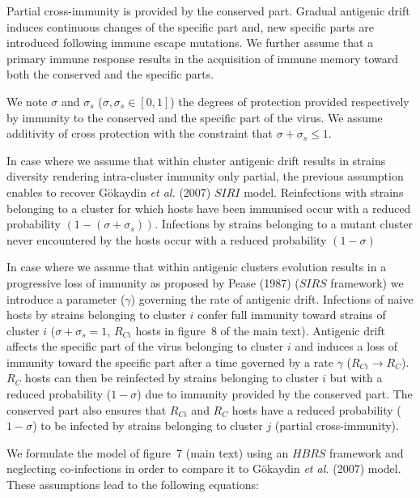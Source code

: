 Partial cross-immunity is provided by the conserved part. Gradual
antigenic drift induces continuous changes of the specific part and,
new specific parts are introduced following immune escape mutations.
We further assume that a primary immune response results in the
acquisition of immune memory toward both the conserved and the
specific parts.

We note $\sigma$ and $\sigma_s$ ($\sigma, \sigma_s \in [0,1]$) the
degrees of protection provided respectively by immunity to the
conserved and the specific part of the virus. We assume additivity of
cross protection with the constraint that $\sigma + \sigma_s \leq 1$.

In case where we assume that within cluster antigenic drift results in
strains diversity rendering intra-cluster immunity only partial, the
previous assumption enables to recover Gökaydin \textit{et al.} (2007)
$SIRI$ model. Reinfections with strains belonging to a cluster for
which hosts have been immunised occur with a reduced probability
$(1-(\sigma+\sigma_s))$. Infections by strains belonging to a mutant
cluster never encountered by the hosts occur with a reduced
probability $(1-\sigma)$

In case where we assume that within antigenic clusters evolution
results in a progressive loss of immunity as proposed by Pease (1987)
($SIRS$ framework) we introduce a parameter ($\gamma$) governing the
rate of antigenic drift. Infections of naive hosts by strains
belonging to cluster $i$ confer full immunity toward strains of
cluster $i$ ($\sigma+\sigma_s=1$, $R_{Ci}$ hosts in figure~8 of the
main text). Antigenic drift affects the specific part of the virus
belonging to cluster $i$ and induces a loss of immunity toward the
specific part after a time governed by a rate $\gamma$ ($R_{Ci} \to
R_C$). $R_C$ hosts can then be reinfected by strains belonging to
cluster $i$ but with a reduced probability ($1-\sigma$) due to
immunity provided by the conserved part. The conserved part also
ensures that $R_{Ci}$ and $R_C$ hosts have a reduced
probability ($1-\sigma$) to be infected by strains belonging to
cluster $j$ (partial cross-immunity).

We formulate the model of figure~7 (main text) using an
$HBRS$ framework and neglecting co-infections in order to compare it
to Gökaydin \textit{et al.} (2007) model.  These assumptions lead to
the following equations:

